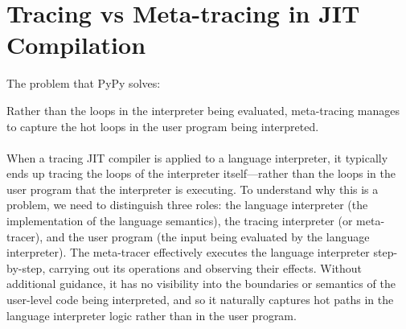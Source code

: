 


    \section[\texorpdfstring{Tracing vs Meta-tracing in JIT Compilation}{Tracing vs Meta-tracing}]{Tracing vs Meta-tracing in JIT Compilation}
        \begin{mainpoint}
            The problem that PyPy solves:

            Rather than the loops in the interpreter being evaluated, meta-tracing manages to capture the hot loops in the user program being interpreted.
        \end{mainpoint}

        \paragraph{}%
            When a tracing JIT compiler is applied to a language interpreter, it typically ends up tracing the loops of the interpreter itself—rather than the loops in the user program that the interpreter is executing. To understand why this is a problem, we need to distinguish three roles: the language interpreter (the implementation of the language semantics), the tracing interpreter (or meta-tracer), and the user program (the input being evaluated by the language interpreter). The meta-tracer effectively executes the language interpreter step-by-step, carrying out its operations and observing their effects. Without additional guidance, it has no visibility into the boundaries or semantics of the user-level code being interpreted, and so it naturally captures hot paths in the language interpreter logic rather than in the user program.

